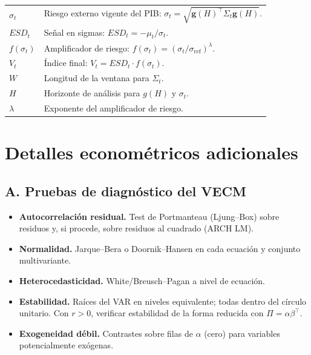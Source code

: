 \documentclass[11pt,a4paper]{article}
\newcommand{\1}{\mathbf{1}}
\newcommand{\vect}[1]{\boldsymbol{#1}}
\begin{document}
\begin{table}[h!]
\begin{tabular}{@{}p{3.3cm}p{11.5cm}@{}}
$\sigma_t$ & Riesgo externo vigente del PIB: $\sigma_t=\sqrt{\vect{g}(H)^\top \Sigma_t \vect{g}(H)}$. \\[2pt]
$ESD_t$ & Señal en sigmas: $ESD_t = -\mu_t/\sigma_t$. \\[2pt]
$f(\sigma_t)$ & Amplificador de riesgo: $f(\sigma_t)=(\sigma_t/\sigma_{\text{ref}})^\lambda$. \\[2pt]
$V_t$ & Índice final: $V_t = ESD_t \cdot f(\sigma_t)$. \\[2pt]
$W$ & Longitud de la ventana para $\Sigma_t$. \\[2pt]
$H$ & Horizonte de análisis para $g(H)$ y $\sigma_t$. \\[2pt]
$\lambda$ & Exponente del amplificador de riesgo. \\[2pt]
\bottomrule
\end{tabular}
\end{table}


\section{Detalles econométricos adicionales}
\label{app:eco_details}

\subsection*{A. Pruebas de diagnóstico del VECM}
\begin{itemize}
  \item \textbf{Autocorrelación residual.} Test de Portmanteau (Ljung--Box) sobre residuos y, si procede, sobre residuos al cuadrado (ARCH LM).
  \item \textbf{Normalidad.} Jarque--Bera o Doornik--Hansen en cada ecuación y conjunto multivariante.
  \item \textbf{Heterocedasticidad.} White/Breusch--Pagan a nivel de ecuación.
  \item \textbf{Estabilidad.} Raíces del VAR en niveles equivalente; todas dentro del círculo unitario. Con $r>0$, verificar estabilidad de la forma reducida con $\Pi=\alpha\beta^\top$.
  \item \textbf{Exogeneidad débil.} Contrastes sobre filas de $\alpha$ (cero) para variables potencialmente exógenas.
\end{itemize}
\end{document}
